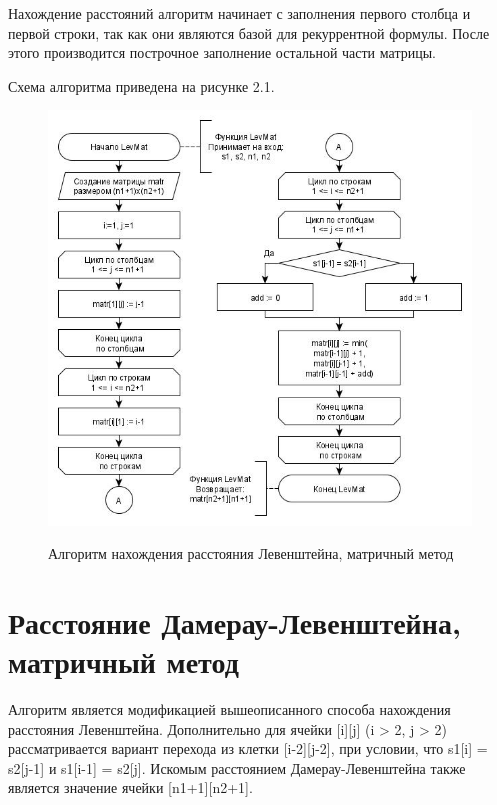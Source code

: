 \documentclass[10pt,a4paper]{report}
\begin{document}
	Нахождение расстояний алгоритм начинает с заполнения первого столбца и первой строки, так как они являются базой для рекуррентной формулы. После этого производится построчное заполнение остальной части матрицы.
	
	Схема алгоритма приведена на рисунке 2.1.
	\begin{figure}[h]
		\begin{center}
			{\includegraphics[scale = 0.7]{Lev_mat}}
			\caption{Алгоритм нахождения расстояния Левенштейна, матричный метод}
		\end{center}
	\end{figure}

	\section{Расстояние Дамерау-Левенштейна, матричный метод}
	Алгоритм является модификацией вышеописанного способа нахождения расстояния Левенштейна. Дополнительно для ячейки [i][j] (i > 2, j > 2) рассматривается вариант перехода из клетки [i-2][j-2], при условии, что s1[i] = s2[j-1] и s1[i-1] = s2[j]. Искомым расстоянием Дамерау-Левенштейна также является значение ячейки [n1+1][n2+1].
	
\end{document}
